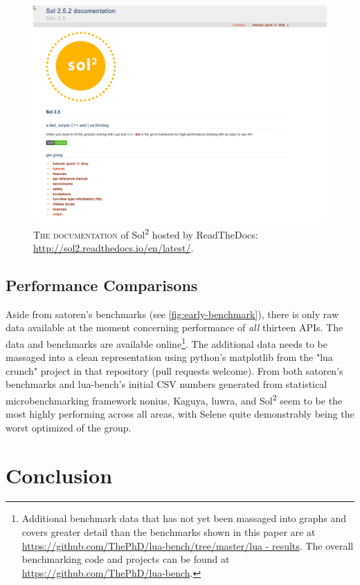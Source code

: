 \documentclass[conference,compsoc]{IEEEtran}
\newcommand{\soltwo}{Sol\textsuperscript{2}}
\begin{document}
\begin{figure}[ht]
\includegraphics[width=\textwidth]{docs}
\centering
\caption{\textsc{The documentation} of \soltwo{} hosted by ReadTheDocs: \url{http://sol2.readthedocs.io/en/latest/}.}
\label{fig:docs}
\end{figure}


\subsection{Performance Comparisons}

Aside from satoren's benchmarks (see \cref{fig:early-benchmark}), there is only raw data available at the moment concerning performance of \emph{all} thirteen APIs. The data and benchmarks are available online\footnote{Additional benchmark data that has not yet been massaged into graphs and covers greater detail than the benchmarks shown in this paper are at \url{https://github.com/ThePhD/lua-bench/tree/master/lua - results}. The overall benchmarking code and projects can be found at \url{https://github.com/ThePhD/lua-bench}.}. The additional data needs to be massaged into a clean representation using python's matplotlib from the "lua crunch" project in that repository (pull requests welcome). From both satoren's benchmarks and lua-bench's initial CSV numbers generated from statistical microbenchmarking framework nonius\cite{nonius}, Kaguya, luwra, and \soltwo{} seem to be the most highly performing across all areas, with Selene quite demonstrably being the worst optimized of the group.


\section{Conclusion}
\end{document}
